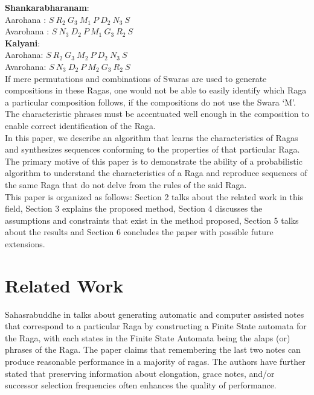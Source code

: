 \documentclass[journal]{IEEEtran}
\begin{document}
\textbf{Shankarabharanam}:\\ 
Aarohana : $S\ R_2\ G_3\ M_1\ P\ D_2\ N_3\ S$\\   
Avarohana : $S\ N_3\ D_2\ P\ M_1\ G_3\ R_2\ S$\\  

\textbf{Kalyani}:\\
Aarohana: $S\ R_2\ G_3\ M_2\ P\ D_2\ N_3\ S$\\
Avarohana: $S\ N_3\ D_2\ P\ M_2\ G_3\ R_2\ S$\\

If mere permutations and combinations of Swaras are used to generate compositions in these Ragas, one would not be able to easily identify which Raga a particular composition follows, if the compositions do not use the Swara ‘M’. The characteristic phrases must be accentuated well enough in the composition to enable correct identification of the Raga.\\  

In this paper, we describe an algorithm that learns the characteristics of Ragas and synthesizes sequences conforming to the properties of that particular Raga. The primary motive of this paper is to demonstrate the ability of a probabilistic algorithm to understand the characteristics of a Raga and reproduce sequences of the same Raga that do not delve from the rules of the said Raga.\\

This paper is organized as follows: Section 2 talks about the related work in this field, Section 3 explains the proposed method, Section 4 discusses the assumptions and constraints that exist in the method proposed, Section 5 talks about the results and Section 6 concludes the paper with possible future extensions.\\

\section{Related Work}
Sahasrabuddhe in \cite{saha} talks about generating automatic and computer assisted notes that correspond to a particular Raga by constructing a Finite State automata for the Raga, with each states in the Finite State Automata being the alaps (or) phrases of the Raga. The paper claims that remembering the last two notes can produce reasonable performance in a majority of ragas. The authors have further stated that preserving information about elongation, grace notes, and/or successor selection frequencies often enhances the quality of performance.\\
\end{document}
